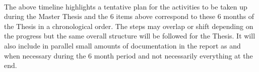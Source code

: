 \noindent
\\The above timeline highlights a tentative plan for the activities to be taken up during the Master Thesis and the $6$ items above correspond to these $6$ months of the Thesis in a chronological order. The steps may overlap or shift depending on the progress but the same overall structure will be followed for the Thesis. It will also include in parallel small amounts of documentation in the report as and when necessary during the $6$ month period and not necessarily everything at the end.\par
